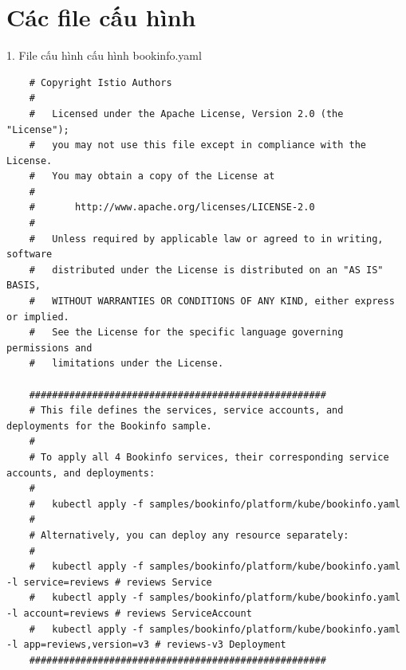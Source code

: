 \documentclass[14pt,a4paper]{book}
\begin{document}
{{\chapter{Các file cấu hình}
1. File cấu hình cấu hình bookinfo.yaml
\begin{lstlisting}
	# Copyright Istio Authors
	#
	#   Licensed under the Apache License, Version 2.0 (the "License");
	#   you may not use this file except in compliance with the License.
	#   You may obtain a copy of the License at
	#
	#       http://www.apache.org/licenses/LICENSE-2.0
	#
	#   Unless required by applicable law or agreed to in writing, software
	#   distributed under the License is distributed on an "AS IS" BASIS,
	#   WITHOUT WARRANTIES OR CONDITIONS OF ANY KIND, either express or implied.
	#   See the License for the specific language governing permissions and
	#   limitations under the License.
	
	####################################################
	# This file defines the services, service accounts, and deployments for the Bookinfo sample.
	#
	# To apply all 4 Bookinfo services, their corresponding service accounts, and deployments:
	#
	#   kubectl apply -f samples/bookinfo/platform/kube/bookinfo.yaml
	#
	# Alternatively, you can deploy any resource separately:
	#
	#   kubectl apply -f samples/bookinfo/platform/kube/bookinfo.yaml -l service=reviews # reviews Service
	#   kubectl apply -f samples/bookinfo/platform/kube/bookinfo.yaml -l account=reviews # reviews ServiceAccount
	#   kubectl apply -f samples/bookinfo/platform/kube/bookinfo.yaml -l app=reviews,version=v3 # reviews-v3 Deployment
	####################################################
	

\end{lstlisting}}}
\end{document}
